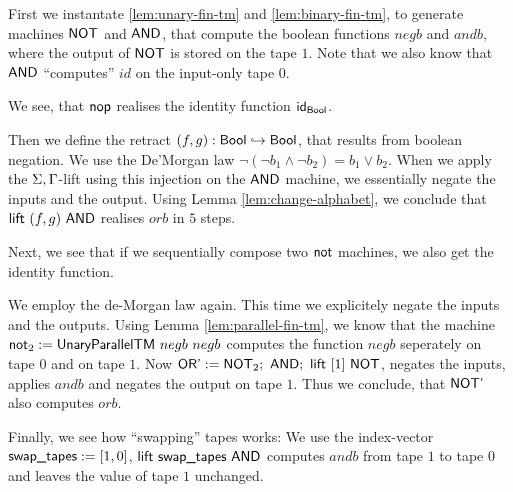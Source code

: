 \documentclass{psartcl}
\begin{document}
First we instantate \ref{lem:unary-fin-tm} and \ref{lem:binary-fin-tm}, to generate machines $\textsf{NOT}$ and $\textsf{AND}$, that compute the boolean
functions $negb$ and $andb$, where the output of $\textsf{NOT}$ is stored on the tape $1$.
Note that we also know that $\textsf{AND}$ ``computes'' $id$ on the input-only tape $0$.

We see, that $\textsf{nop}$ realises the identity function $\textsf{id}_{\textsf{Bool}}$.

Then we define the retract $(f, g) : \textsf{Bool} \hookrightarrow \textsf{Bool}$, that results from boolean negation.
We use the De'Morgan law $\neg(\neg b_1 \land \neg b_2) = b_1 \lor b_2$.
When we apply the $\Sigma,\Gamma$-lift using this injection on the $\textsf{AND}$ machine, we essentially negate the inputs and the output.
Using Lemma \ref{lem:change-alphabet}, we conclude that $\textsf{lift}~(f,g)~\textsf{AND}$ realises $orb$ in $5$ steps.

Next, we see that if we sequentially compose two $\textsf{not}$ machines, we also get the identity function.

We employ the de-Morgan law again.  This time we explicitely negate the inputs and the outputs.
Using Lemma \ref{lem:parallel-fin-tm}, we know that the machine $\textsf{not}_2 := \textsf{UnaryParallelTM}~negb~negb$ computes the function $negb$
seperately on tape $0$ and on tape $1$.
Now $\textsf{OR'} := \textsf{NOT}_2 ;~ \textsf{AND} ;~ \textsf{lift}~[1]~\textsf{NOT}$, negates the inputs, applies $andb$ and negates the output on tape $1$.
Thus we conclude, that $\textsf{NOT'}$ also computes $orb$.

Finally, we see how ``swapping'' tapes works:  We use the index-vector $\textsf{swap\_tapes} := [1,0]$, $\textsf{lift}~\textsf{swap\_tapes}~\textsf{AND}$ computes
$andb$ from tape $1$ to tape $0$ and leaves the value of tape $1$ unchanged.
\end{document}
